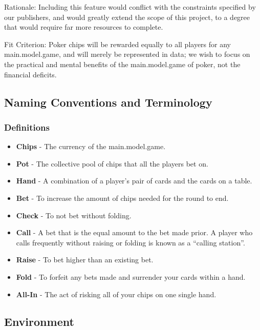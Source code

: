 \documentclass[12pt, titlepage]{article}
\begin{document}
Rationale: Including this feature would conflict with the constraints specified by our publishers, and would greatly extend the scope of this project, to a degree that would require far more resources to complete.

Fit Criterion: Poker chips will be rewarded equally to all players for any main.model.game, and will merely be represented in data; we wish to focus on the practical and mental benefits of the main.model.game of poker, not the financial deficits.

\subsection{Naming Conventions and Terminology}
\subsubsection{Definitions}
\begin{itemize}
    \item \textbf{Chips} - The currency of the main.model.game.
    \item \textbf{Pot} - The collective pool of chips that all the players bet on.
    \item \textbf{Hand} - A combination of a player's pair of cards and the cards on a table.
    \item \textbf{Bet} - To increase the amount of chips needed for the round to end.
    \item \textbf{Check} - To not bet without folding.
    \item \textbf{Call} - A bet that is the equal amount to the bet made prior. A player who calls frequently without raising or folding is known as a “calling station”.
    \item \textbf{Raise} - To bet higher than an existing bet.
    \item \textbf{Fold} - To forfeit any bets made and surrender your cards within a hand.
    \item \textbf{All-In} - The act of risking all of your chips on one single hand.
\end{itemize}

\subsection{Environment}
\end{document}

